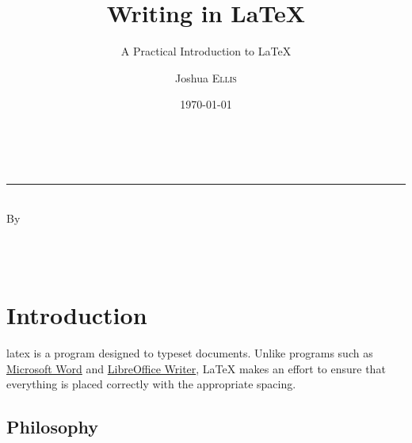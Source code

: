 \documentclass[twoside, onecolumn, bibliography=totoc, parskip=half*]{scrartcl}
\title{Writing in \texorpdfstring{\LaTeX}{LaTeX}}
\subtitle{A Practical Introduction to \texorpdfstring{\LaTeX}{LaTeX}}
\author{Joshua \scshape Ellis}
\date{\today}
\makeatletter
\newcommand{\@degreetitle}{}
\newcommand{\@department}{}
\newcommand{\@university}{}
\makeatother
\begin{document}

\pagestyle{empty}

\begin{titlepage}
  \makeatletter

  \begin{center}
    \vspace*{2.5cm}

    \Huge \@title \\[0em]
    \rule{\linewidth}{2pt}
    \huge \textsc{\@subtitle}\\[6em]

    \large By \\[1cm]
    \huge \@author \\[0.5ex]
    \Large \normalfont \@degreetitle

    \vfill

    \Large \@department \\[1ex]
    \Large \@university

    \vfill

    \large \@date
  \end{center}

\makeatother
\end{titlepage}

\cleardoublepage
\pagestyle{plain}

\tableofcontents

\cleardoublepage
\pagestyle{headings}

\section{Introduction}
\label{sec:introduction}

\gls{latex} is a program designed to typeset documents.  Unlike programs such as
\href{http://office.microsoft.com/en-au/word/}{Microsoft Word} and
\href{http://www.libreoffice.org/discover/writer/}{Libre\-Office Writer}, LaTeX
makes an effort to ensure that everything is placed correctly with the
appropriate spacing.

\subsection{Philosophy}
\label{subsec:philosophy}
\end{document}
